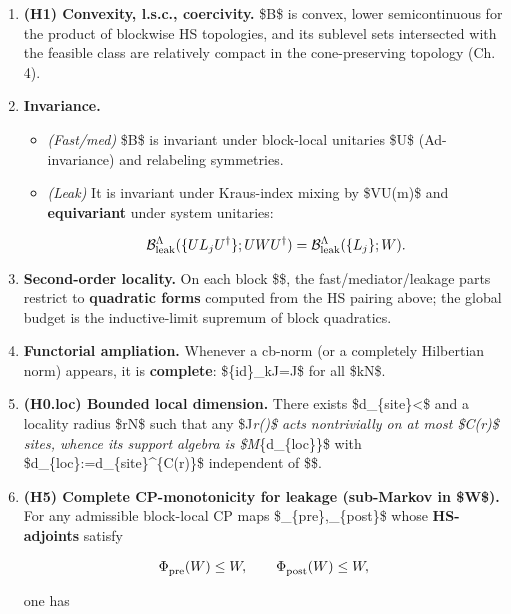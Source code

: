 \documentclass[
]{article}
\numberwithin{equation}{section}
\begin{document}
\begin{enumerate}
\def\labelenumi{\arabic{enumi}.}
\item
  \textbf{(H1) Convexity, l.s.c., coercivity.} \$\mathcal B\$ is convex,
  lower semicontinuous for the product of blockwise HS topologies, and
  its sublevel sets intersected with the feasible class are relatively
  compact in the cone-preserving topology (Ch. 4).
\item
  \textbf{Invariance.}

  \begin{itemize}
  \item
    \emph{(Fast/med)} \$\mathcal B\$ is invariant under block-local
    unitaries \$U\$ (Ad-invariance) and relabeling symmetries.
  \item
    \emph{(Leak)} It is invariant under Kraus-index mixing by
    \$V\in U(m)\$ and \textbf{equivariant} under system unitaries:

    \[
    \mathcal B_{\rm leak}^\Lambda(\{UL_jU^\dagger\};UWU^\dagger)=\mathcal B_{\rm leak}^\Lambda(\{L_j\};W).
    \]
  \end{itemize}
\item
  \textbf{Second-order locality.} On each block \$\Lambda\$, the
  fast/mediator/leakage parts restrict to \textbf{quadratic forms}
  computed from the HS pairing above; the global budget is the
  inductive-limit supremum of block quadratics.
\item
  \textbf{Functorial ampliation.} Whenever a cb-norm (or a completely
  Hilbertian norm) appears, it is \textbf{complete}:
  \$\textbar\{\rm id\}\_k\otimes \mathcal J\textbar=\textbar{}\mathcal J\textbar\$
  for all \$k\in\mathbb N\$.
\item
  \textbf{(H0.loc) Bounded local dimension.} There exists
  \$d\_\{\rm site\}\textless{}\infty\$ and a locality radius
  \$r\in\mathbb N\$ such that any
  \$\mathcal J\in{}\emph{r(\Lambda)\$ acts nontrivially on at
  most \$C(r)\$ sites, whence its support algebra is
  \$\cong M}\{d\_\{\rm loc\}\}\$ with
  \$d\_\{\rm loc\}:=d\_\{\rm site\}\^{}\{C(r)\}\$ independent of
  \$\Lambda\$.
\item
  \textbf{(H5) Complete CP-monotonicity for leakage (sub-Markov in
  \$W\$).} For any admissible block-local CP maps
  \$\Phi\_\{\rm pre\},\Phi\_\{\rm post\}\$ whose \textbf{HS-adjoints}
  satisfy

  \[
  \Phi_{\rm pre}^{\!}(W)\le W,\qquad \Phi_{\rm post}^{\!}(W)\le W,
  \]

  one has


\end{enumerate}
\end{document}
